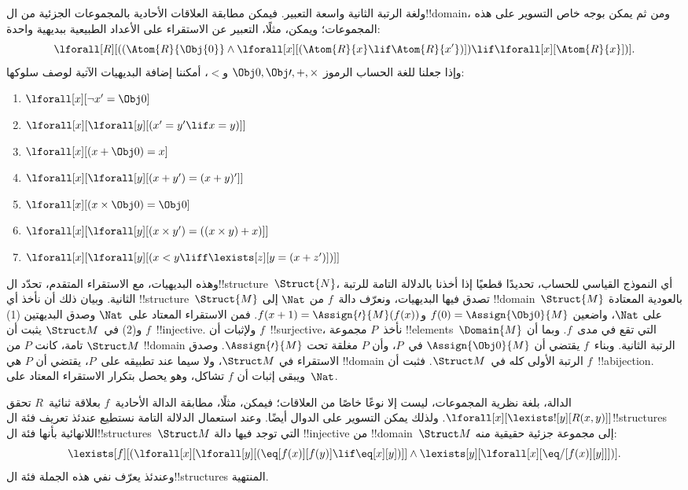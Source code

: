 \documentclass[../../../include/open-logic-section]{subfiles}
\begin{document}
ولغة الرتبة الثانية واسعة التعبير. فيمكن مطابقة العلاقات الأحادية
بالمجموعات الجزئية من ال!!{domain}، ومن ثم يمكن بوجه خاص التسوير على
هذه المجموعات؛ ويمكن، مثلًا، التعبير عن الاستقراء على الأعداد الطبيعية
ببديهية واحدة:
\[
\lforall[R][((\Atom{R}{\Obj{0}} \land \lforall[x][(\Atom{R}{x} \lif
    \Atom{R}{x'})]) \lif \lforall[x][\Atom{R}{x}])].
\]
وإذا جعلنا للغة الحساب الرموز $\Obj 0, \Obj \prime, +,
\times$ و$<$، أمكننا إضافة البديهيات الآتية لوصف سلوكها:
\begin{enumerate}
\item $\lforall[x][\lnot x' = \Obj 0]$
\item $\lforall[x][\lforall[y][(x' = y' \lif x = y)]]$
\item $\lforall[x][(x + \Obj 0) = x]$
\item $\lforall[x][\lforall[y][(x + y') = (x + y)']]$
\item $\lforall[x][(x \times \Obj 0) = \Obj 0]$
\item $\lforall[x][\lforall[y][(x \times y') = ((x \times y) + x)]]$
\item $\lforall[x][\lforall[y][(x < y \liff \lexists[z][y = (x + z')])]]$
\end{enumerate}
وهذه البديهيات، مع الاستقراء المتقدم، تحدّد
ال!!{structure}~$\Struct{N}$، أي النموذج القياسي للحساب، تحديدًا
قطعيًا إذا أخذنا بالدلالة التامة للرتبة الثانية. وبيان ذلك أن
نأخذ أي !!{structure}~$\Struct{M}$ تصدق فيها البديهيات، ونعرّف
دالة~$f$ من $\Nat$ إلى !!{domain}~$\Struct{M}$ بالعودية
المعتادة على $\Nat$، واضعين $f(0) = \Assign{\Obj 0}{M}$
و$f(x+1) = \Assign{\prime}{M}(f(x))$. فمن الاستقراء المعتاد
على~$\Nat$ وصدق البديهتين (1) و(2) في~$\Struct M$ يثبت أن
$f$~!!{injective}. ولإثبات أن $f$~!!{surjective}، نأخذ~$P$
مجموعة !!{element}s~$\Domain{M}$ التي تقع في مدى~$f$.
وبما أن $\Struct M$ تامة، كانت $P$ من
!!{domain} الرتبة الثانية. وبناء~$f$ يقتضي أن
$\Assign{\Obj 0}{M}$ في~$P$، وأن $P$ مغلقة تحت
$\Assign{\prime}{M}$. وصدق الاستقراء في $\Struct M$، ولا سيما
عند تطبيقه على~$P$، يقتضي أن $P$ هي !!{domain} الرتبة الأولى
كله في~$\Struct M$. فثبت أن $f$~!!a{bijection}.
ويبقى إثبات أن $f$ تشاكل، وهو يحصل بتكرار الاستقراء المعتاد
على~$\Nat$.

الدالة، بلغة نظرية المجموعات، ليست إلا نوعًا خاصًا من العلاقات؛ فيمكن،
مثلًا، مطابقة الدالة الأحادية~$f$ بعلاقة ثنائية~$R$ تحقق
$\lforall[x][\lexists![y][R(x,y)]]$. ولذلك يمكن التسوير على الدوال
أيضًا. وعند استعمال الدلالة التامة نستطيع عندئذ تعريف فئة
ال!!{structure}s اللانهائية بأنها فئة ال!!{structure}s~$\Struct M$
التي توجد فيها دالة !!{injective} من !!{domain}~$\Struct M$ إلى
مجموعة جزئية حقيقية منه:
\[
\lexists[f][(\lforall[x][\lforall[y][(\eq[f(x)][f(y)] \lif \eq[x][y])]]
  \land \lexists[y][\lforall[x][\eq/[f(x)][y]]])].
\]
وعندئذ يعرّف نفي هذه الجملة فئة ال!!{structure}s المنتهية.
\end{document}
